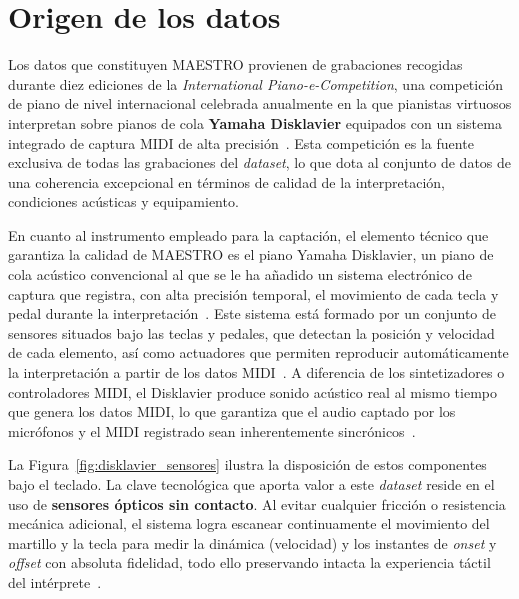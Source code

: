 \documentclass[11pt,spanish,listoffigures,listoftables]{tfgetsinf}
\begin{document}
\section{Origen de los datos}
\label{sec:maestro_origen}
Los datos que constituyen MAESTRO provienen de grabaciones recogidas durante diez ediciones de la \textit{International Piano-e-Competition}, una competición de 
piano de nivel internacional celebrada anualmente en la que pianistas virtuosos interpretan sobre pianos de cola \textbf{Yamaha Disklavier}
equipados con un sistema integrado de captura MIDI de alta precisión~\cite{magenta2020maestrov3}. Esta competición es la fuente exclusiva de todas las grabaciones del \textit{dataset}, lo que dota al 
conjunto de datos de una coherencia excepcional en términos de calidad de la interpretación, condiciones acústicas y equipamiento.


En cuanto al instrumento empleado para la captación, el elemento técnico que garantiza la calidad de MAESTRO es el piano Yamaha Disklavier, un piano de cola acústico convencional al que se le ha añadido un sistema 
electrónico de captura que registra, con alta precisión temporal, el movimiento de cada tecla y pedal durante la interpretación~\cite{hawthorne2019maestro}. Este sistema está formado por un conjunto de sensores situados bajo las teclas y pedales, que detectan la posición y velocidad de cada elemento, así como actuadores que permiten reproducir automáticamente la interpretación a partir de los datos MIDI~\cite{yamaha_disklavier}. A diferencia de los sintetizadores
o controladores MIDI, el Disklavier produce sonido acústico real al mismo tiempo que genera los datos MIDI, lo que garantiza que el audio captado por los micrófonos
y el MIDI registrado sean inherentemente sincrónicos~\cite{hawthorne2019maestro}. 

La Figura~\ref{fig:disklavier_sensores} ilustra la disposición de
estos componentes bajo el teclado. La clave tecnológica que aporta
valor a este \textit{dataset} reside en el uso de \textbf{sensores
ópticos sin contacto}. Al evitar cualquier fricción o resistencia
mecánica adicional, el sistema logra escanear continuamente el
movimiento del martillo y la tecla para medir la dinámica (velocidad)
y los instantes de \textit{onset} y \textit{offset} con absoluta
fidelidad, todo ello preservando intacta la experiencia táctil
del intérprete~\cite{yamaha_disklavier}.
\end{document}

